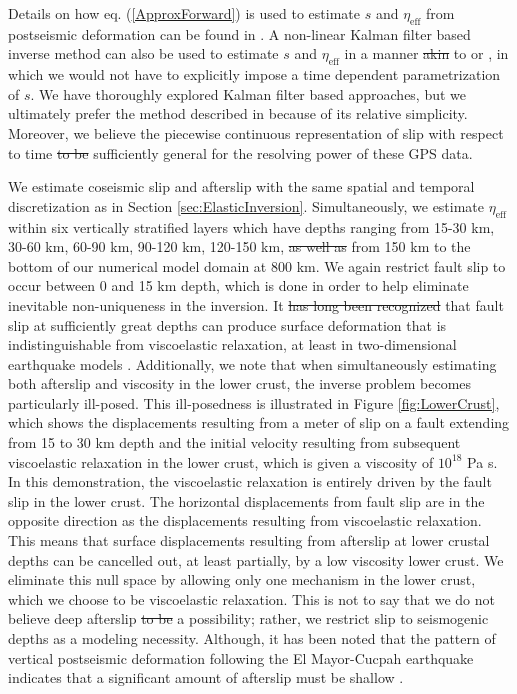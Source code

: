 \documentclass[draft,linenumbers]{AGUJournal}
\providecommand{\DIFadd}[1]{{\protect\color{blue}\uwave{#1}}} %
\providecommand{\DIFdel}[1]{{\protect\color{red}\sout{#1}}}                      %
\providecommand{\DIFaddbegin}{} %
\providecommand{\DIFaddend}{} %
\providecommand{\DIFdelbegin}{} %
\providecommand{\DIFdelend}{} %
\begin{document}
Details on how eq. (\ref{ApproxForward}) is used to estimate $s$ and $\eta_\mathrm{eff}$ from postseismic deformation can be found in \citet{Hines2016}.  A non-linear Kalman filter based inverse method can also be used to estimate $s$ and $\eta_{\mathrm{eff}}$ in a manner \DIFdelbegin \DIFdel{akin }\DIFdelend \DIFaddbegin \DIFadd{similar }\DIFaddend to \citet{Segall1997} or \citet{McGuire2003}, in which we would not have to explicitly impose a time dependent parametrization of $s$. We have thoroughly explored Kalman filter based approaches, but we ultimately prefer the method described in \citet{Hines2016} because of its relative simplicity. Moreover, we believe the piecewise continuous representation of slip with respect to time \DIFdelbegin \DIFdel{to be }\DIFdelend \DIFaddbegin \DIFadd{is }\DIFaddend sufficiently general for the resolving power of these GPS data.

We estimate coseismic slip and afterslip with the same spatial and temporal discretization as in Section \ref{sec:ElasticInversion}. Simultaneously, we estimate $\eta_{\mathrm{eff}}$ within six vertically stratified layers which have depths ranging from 15-30 km, 30-60 km, 60-90 km, 90-120 km, 120-150 km, \DIFdelbegin \DIFdel{as well as }\DIFdelend \DIFaddbegin \DIFadd{and }\DIFaddend from 150 km to the bottom of our numerical model domain at 800 km.  We again restrict fault slip to occur between 0 and 15 km depth, which is done in order to help eliminate inevitable non-uniqueness in the inversion.  It \DIFdelbegin \DIFdel{has long been recognized }\DIFdelend \DIFaddbegin \DIFadd{is well understood }\DIFaddend that fault slip at sufficiently great depths can produce surface deformation that is indistinguishable from viscoelastic relaxation, at least in two-dimensional earthquake models \citep{Savage1990}.  Additionally, we note that when simultaneously estimating both afterslip and viscosity in the lower crust, the inverse problem becomes particularly ill-posed. This ill-posedness is illustrated in Figure \ref{fig:LowerCrust}, which shows the displacements resulting from a meter of slip on a fault extending from 15 to 30 km depth and the initial velocity resulting from subsequent viscoelastic relaxation in the lower crust, which is given a viscosity of $10^{18}$ Pa s.  In this demonstration, the viscoelastic relaxation is entirely driven by the fault slip in the lower crust.  The horizontal displacements from fault slip are in the opposite direction as the displacements resulting from viscoelastic relaxation.  This means that surface displacements resulting from afterslip at lower crustal depths can be cancelled out, at least partially, by a low viscosity lower crust.  We eliminate this null space by allowing only one mechanism in the lower crust, which we choose to be viscoelastic relaxation.  This is not to say that we do not believe deep afterslip \DIFdelbegin \DIFdel{to be }\DIFdelend \DIFaddbegin \DIFadd{is }\DIFaddend a possibility; rather, we restrict slip to seismogenic depths as a modeling necessity. Although, it has been noted that the pattern of vertical postseismic deformation following the El Mayor-Cucpah earthquake indicates that a significant amount of afterslip must be shallow \citep{Rollins2015}.  
\end{document}
